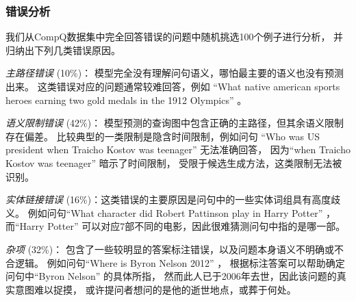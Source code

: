 \subsubsection{错误分析}
%
%
%
%
%

我们从CompQ数据集中完全回答错误的问题中随机挑选100个例子进行分析，
并归纳出下列几类错误原因。

\emph{主路径错误} (10\%)：
模型完全没有理解问句语义，哪怕最主要的语义也没有预测出来。
这类错误对应的问题通常较难回答，例如
``What native american sports heroes earning two gold medals in the 1912 Olympics'' 。%

\emph{语义限制错误} (42\%)：
模型预测的查询图中包含正确的主路径，但其余语义限制存在偏差。
比较典型的一类限制是隐含时间限制，例如问句
``Who was US president when Traicho Kostov was teenager'' 无法准确回答，
因为``when Traicho Kostov was teenager'' 暗示了时间限制，
受限于候选生成方法，这类限制无法被识别。

\emph{实体链接错误} (16\%)：这类错误的主要原因是问句中的一些实体词组具有高度歧义。
例如问句``What character did Robert Pattinson play in Harry Potter'' ，
而``Harry Potter'' 可以对应7部不同的电影，因此很难猜测问句中指的是哪一部。

\emph{杂项} (32\%)： 包含了一些较明显的答案标注错误，以及问题本身语义不明确或不合逻辑。
例如问句``Where is Byron Nelson 2012'' ，
根据标注答案可以帮助确定问句中``Byron Nelson'' 的具体所指，
然而此人已于2006年去世，因此该问题的真实意图难以捉摸，
或许提问者想问的是他的逝世地点，或葬于何处。%


